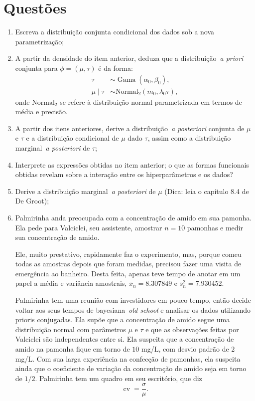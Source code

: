 \documentclass[a4paper,10pt, notitlepage]{report}
\begin{document}
\section*{Questões}
\begin{enumerate}
 \item Escreva a distribuição conjunta condicional dos dados sob a nova parametrização;
 \item A partir da densidade do item anterior, deduza que a distribuição~\textit{a priori} conjunta para $\phi = (\mu, \tau)$ é da forma:
 \begin{align}
  \tau &\sim \operatorname{Gama}(\alpha_0, \beta_0),\\
  \mu \mid \tau &\sim \operatorname{Normal_2}(m_0, \lambda_0\tau),
 \end{align}
onde $\operatorname{Normal_2}$ se refere à distribuição normal parametrizada em termos de média e precisão.
\item A partir dos itens anteriores, derive a distribuição~\textit{a posteriori} conjunta de $\mu$ e $\tau$ e a distribuição condicional de $\mu$ dado $\tau$, assim como a distribuição marginal~\textit{a posteriori} de $\tau$;
\item Interprete as expressões obtidas no item anterior; o que as formas funcionais obtidas revelam sobre a interação entre os hiperparâmetros e os dados?
\item Derive a distribuição marginal~\textit{a posteriori} de $\mu$ (Dica: leia o capítulo 8.4 de De Groot);
\item Palmirinha anda preocupada com a concentração de amido em sua pamonha.
Ela pede para Valciclei, seu assistente, amostrar $n=10$ pamonhas e medir sua concentração de amido.

Ele, muito prestativo, rapidamente faz o experimento, mas, porque comeu todas as amostras depois que foram medidas, precisou fazer uma visita de emergência ao banheiro. 
Desta feita, apenas teve tempo de anotar em um papel a média e variância amostrais, $\bar{x}_n =  8.307849$ e $\bar{s}^2_n = 7.930452$.

Palmirinha tem uma reunião com investidores em pouco tempo, então decide voltar aos seus tempos de bayesiana~\textit{old school} e analisar os dados utilizando prioris conjugadas.
Ela supõe que a concentração de amido segue uma distribuição normal com parâmetros $\mu$ e $\tau$ e que as observações feitas por Valciclei são independentes entre si.
Ela suspeita que a concentração de amido na pamonha fique em torno de $10$ mg/L, com desvio padrão de  $2$ mg/L.
Com sua larga experiência na confecção de pamonhas, ela suspeita ainda que o coeficiente de variação da concentração de amido seja em torno de $1/2$.
Palmirinha tem um quadro em seu escritório, que diz
\[ \operatorname{cv} = \frac{\sigma}{\mu}. \]


\end{enumerate}
\end{document}
